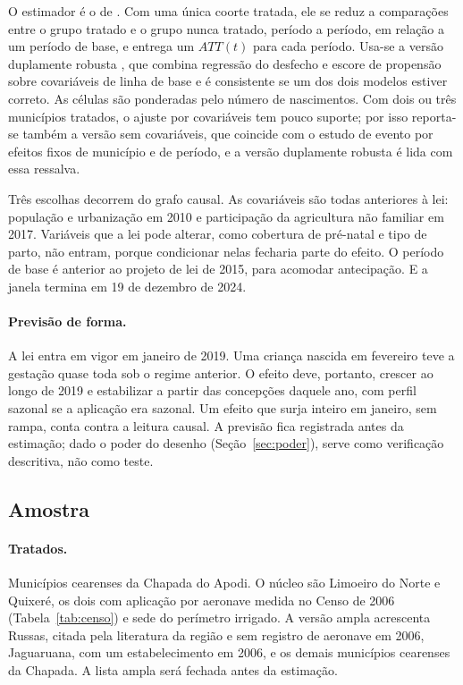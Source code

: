 O estimador é o de . Com uma única coorte tratada,
ele se reduz a comparações entre o grupo tratado e o grupo nunca tratado,
período a período, em relação a um período de base, e entrega um $ATT(t)$ para
cada período. Usa-se a versão duplamente robusta \cite{santanna2020drdid}, que
combina regressão do desfecho e escore de propensão sobre covariáveis de linha
de base e é consistente se um dos dois modelos estiver correto. As células são
ponderadas pelo número de nascimentos. Com dois ou três municípios tratados, o
ajuste por covariáveis tem pouco suporte; por isso reporta-se também a versão
sem covariáveis, que coincide com o estudo de evento por efeitos fixos de
município e de período, e a versão duplamente robusta é lida com essa
ressalva.

Três escolhas decorrem do grafo causal. As covariáveis são todas anteriores à
lei: população e urbanização em 2010 e participação da agricultura não familiar
em 2017.
Variáveis que a lei pode alterar, como cobertura de pré-natal e tipo de parto,
não entram, porque condicionar nelas fecharia parte do efeito. O período de base
é anterior ao projeto de lei de 2015, para acomodar antecipação. E a janela
termina em 19 de dezembro de 2024.

\paragraph{Previsão de forma.} A lei entra em vigor em janeiro de 2019. Uma
criança nascida em fevereiro teve a gestação quase toda sob o regime anterior.
O efeito deve, portanto, crescer ao longo de 2019 e estabilizar a partir das
concepções daquele ano, com perfil sazonal se a aplicação era sazonal. Um
efeito que surja inteiro em janeiro, sem rampa, conta contra a leitura causal.
A previsão fica registrada antes da estimação; dado o poder do desenho
(Seção~\ref{sec:poder}), serve como verificação descritiva, não como teste.

\subsection{Amostra}

\paragraph{Tratados.} Municípios cearenses da Chapada do Apodi. O núcleo são
Limoeiro do Norte e Quixeré, os dois com aplicação por aeronave medida no Censo
de 2006 (Tabela~\ref{tab:censo}) e sede do perímetro irrigado. A versão ampla
acrescenta Russas, citada pela literatura da região e sem registro de aeronave
em 2006, Jaguaruana, com um estabelecimento em 2006, e os demais municípios
cearenses da Chapada. A lista ampla será fechada antes da estimação.

